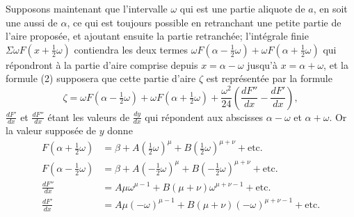 \documentclass{article}
\begin{document}
Supposons maintenant que l'intervalle $\omega$ qui est une partie aliquote de $a$, en soit une aussi de $\alpha$, ce qui est toujours possible en retranchant une petite partie de l'aire proposée, et ajoutant ensuite la partie retranchée; l'intégrale finie $\Sigma\omega F(x+\frac{1}{2}\omega)$ contiendra les deux termes $\omega F(\alpha-\frac{1}{2}\omega)+\omega F(\alpha+\frac{1}{2}\omega)$ qui répondront à la partie d'aire comprise depuis $x=\alpha-\omega$ jusqu'à $x=\alpha+\omega$, et la formule (2) supposera que cette partie d'aire $\zeta$ est représentée par la formule
\[ \zeta=\omega F(\alpha-\tfrac{1}{2}\omega)+\omega F(\alpha+\tfrac{1}{2}\omega)+\frac{\omega^{2}}{24}\left(\frac{dF''}{dx}-\frac{dF'}{dx}\right), \]
$\frac{dF'}{dx}$ et $\frac{dF''}{dx}$ étant les valeurs de $\frac{dy}{dx}$ qui répondent aux abscisses $\alpha-\omega$ et $\alpha+\omega$. Or la valeur supposée de $y$ donne
\[ \begin{aligned} F(\alpha+\tfrac{1}{2}\omega)&=\beta+A(\tfrac{1}{2}\omega)^{\mu}+B(\tfrac{1}{2}\omega)^{\mu+\nu}+\text{etc.}\\ F(\alpha-\tfrac{1}{2}\omega)&=\beta+A(-\tfrac{1}{2}\omega)^{\mu}+B(-\tfrac{1}{2}\omega)^{\mu+\nu}+\text{etc.}\\ \frac{dF''}{dx}&=A\mu\omega^{\mu-1}+B(\mu+\nu)\omega^{\mu+\nu-1}+\text{etc.}\\ \frac{dF'}{dx}&=A\mu(-\omega)^{\mu-1}+B(\mu+\nu)(-\omega)^{\mu+\nu-1}+\text{etc.} \end{aligned} \]
\end{document}
